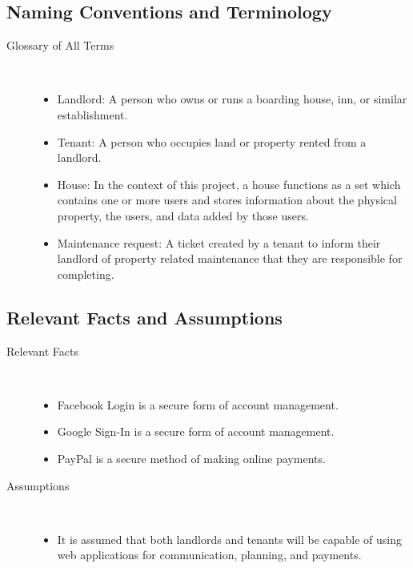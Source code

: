 \documentclass[12pt, titlepage]{article}
\begin{document}
\subsection{Naming Conventions and Terminology} %
\begin{description}
  \item[Glossary of All Terms] \hfill \\
    \begin{itemize}
    \item Landlord: A person who owns or runs a boarding house, inn, or similar
      establishment.
    \item Tenant: A person who occupies land or property rented from a landlord.
    \item House: In the context of this project, a house functions as a set
      which contains one or more users and stores information about the
      physical property, the users, and data added by those users.
    \item Maintenance request: A ticket created by a tenant to inform their
      landlord of property related maintenance that they are responsible for
      completing.
    \end{itemize}
\end{description}
\subsection{Relevant Facts and Assumptions} %
\begin{description}
  \item[Relevant Facts] \hfill \\
  \begin{itemize}
    \item Facebook Login is a secure form of account management.
    \item Google Sign-In is a secure form of account management.
    \item PayPal is a secure method of making online payments.
  \end{itemize}
  \item[Assumptions] \hfill \\
  \begin{itemize}
  \item  It is assumed that both landlords and tenants will be capable of using
    web applications for communication, planning, and payments.
  \end{itemize}
\end{description}  
\end{document}

